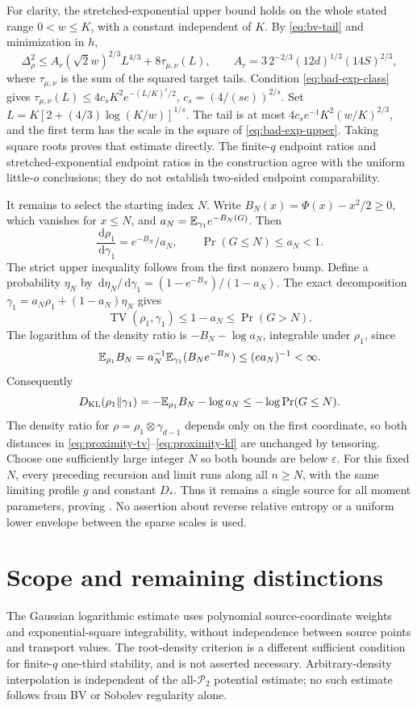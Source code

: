 \documentclass[11pt]{article}
\numberwithin{equation}{section}
\theoremstyle{remark}\newtheorem{remark}[theorem]{Remark}
\newcommand{\Prob}{\mathcal P}\newcommand{\dd}{\,\mathrm d}
\begin{document}
For clarity, the stretched-exponential upper bound holds on the whole stated range $0<w\le K$, with a constant independent of $K$. By \eqref{eq:bv-tail} and minimization in $h$,
\[
 \Delta_\rho^2\le A_r(\sqrt2w)^{2/3}L^{4/3}+8\tau_{\mu,\nu}(L),
 \qquad A_r=3\,2^{-2/3}(12d)^{1/3}(14S)^{2/3},
\]
where $\tau_{\mu,\nu}$ is the sum of the squared target tails. Condition \eqref{eq:bad-exp-class} gives
$\tau_{\mu,\nu}(L)\le4c_sK^2e^{-(L/K)^s/2}$, $c_s=(4/(se))^{2/s}$.
Set $L=K[2+(4/3)\log(K/w)]^{1/s}$. The tail is at most $4c_se^{-1}K^2(w/K)^{2/3}$, and the first term has the scale in the square of \eqref{eq:bad-exp-upper}. Taking square roots proves that estimate directly. The finite-$q$ endpoint ratios and stretched-exponential endpoint ratios in the construction agree with the uniform little-$o$ conclusions; they do not establish two-sided endpoint comparability.

It remains to select the starting index $N$. Write
$B_N(x)=\Phi(x)-x^2/2\ge0$, which vanishes for $x\le N$, and
$a_N=\mathbb E_{\gamma_1}e^{-B_N(G)}$. Then
\[
 \frac{\dd\rho_1}{\dd\gamma_1}=e^{-B_N}/a_N,\qquad
 \Pr(G\le N)\le a_N<1.
\]
The strict upper inequality follows from the first nonzero bump. Define a probability $\eta_N$ by
$\dd\eta_N/\dd\gamma_1=(1-e^{-B_N})/(1-a_N)$. The exact decomposition
$\gamma_1=a_N\rho_1+(1-a_N)\eta_N$ gives
\begin{equation}\label{eq:proximity-tv}
 \operatorname{TV}(\rho_1,\gamma_1)\le1-a_N\le\Pr(G>N).
\end{equation}
The logarithm of the density ratio is $-B_N-\log a_N$, integrable under $\rho_1$, since
\[
 \mathbb E_{\rho_1}B_N=a_N^{-1}\mathbb E_{\gamma_1}(B_Ne^{-B_N})\le(ea_N)^{-1}<\infty.
\]
Consequently
\begin{equation}\label{eq:proximity-kl}
 D_{\mathrm{KL}}(\rho_1\Vert\gamma_1)
 =-\mathbb E_{\rho_1}B_N-\log a_N
 \le-\log\Pr(G\le N).
\end{equation}
The density ratio for $\rho=\rho_1\otimes\gamma_{d-1}$ depends only on the first coordinate, so both distances in \eqref{eq:proximity-tv}--\eqref{eq:proximity-kl} are unchanged by tensoring. Choose one sufficiently large integer $N$ so both bounds are below $\varepsilon$. For this fixed $N$, every preceding recursion and limit runs along all $n\ge N$, with the same limiting profile $g$ and constant $D_*$. Thus it remains a single source for all moment parameters, proving . No assertion about reverse relative entropy or a uniform lower envelope between the sparse scales is used.

\section{Scope and remaining distinctions}
The Gaussian logarithmic estimate uses polynomial source-coordinate weights and exponential-square integrability, without independence between source points and transport values. The root-density criterion is a different sufficient condition for finite-$q$ one-third stability, and is not asserted necessary. Arbitrary-density interpolation is independent of the all-$\Prob_2$ potential estimate; no such estimate follows from BV or Sobolev regularity alone.
\end{document}
